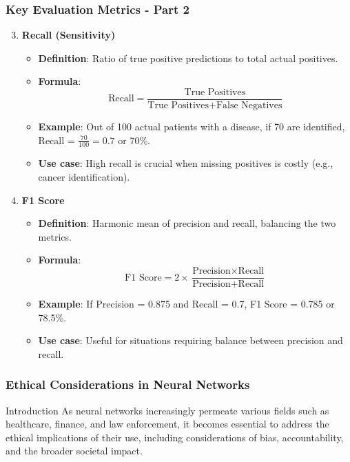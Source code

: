 \documentclass[aspectratio=169]{beamer}
\begin{document}
\begin{frame}[fragile]
    \frametitle{Key Evaluation Metrics - Part 2}
    \begin{enumerate}
        \setcounter{enumii}{2} %
        \item \textbf{Recall (Sensitivity)}
        \begin{itemize}
            \item \textbf{Definition}: Ratio of true positive predictions to total actual positives.
            \item \textbf{Formula}:
            \begin{equation}
                \text{Recall} = \frac{\text{True Positives}}{\text{True Positives} + \text{False Negatives}} 
            \end{equation}
            \item \textbf{Example}: Out of 100 actual patients with a disease, if 70 are identified, 
            Recall = \( \frac{70}{100} = 0.7 \) or 70\%.
            \item \textbf{Use case}: High recall is crucial when missing positives is costly (e.g., cancer identification).
        \end{itemize}

        \item \textbf{F1 Score}
        \begin{itemize}
            \item \textbf{Definition}: Harmonic mean of precision and recall, balancing the two metrics.
            \item \textbf{Formula}:
            \begin{equation}
                \text{F1 Score} = 2 \times \frac{\text{Precision} \times \text{Recall}}{\text{Precision} + \text{Recall}} 
            \end{equation}
            \item \textbf{Example}: If Precision = 0.875 and Recall = 0.7, 
            F1 Score = 0.785 or 78.5\%.
            \item \textbf{Use case}: Useful for situations requiring balance between precision and recall.
        \end{itemize}
    \end{enumerate}
\end{frame}

\begin{frame}[fragile]
  \frametitle{Ethical Considerations in Neural Networks}
  \begin{block}{Introduction}
    As neural networks increasingly permeate various fields such as healthcare, finance, and law enforcement, 
    it becomes essential to address the ethical implications of their use, including considerations of bias, accountability, 
    and the broader societal impact.
  \end{block}
\end{frame}
\end{document}
